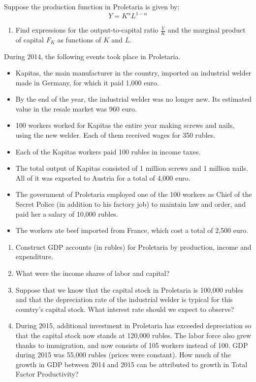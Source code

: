 Suppose the production function in Proletaria is given by:
\[
Y=K^\alpha L^{1-\alpha}
\]
\begin{enumerate}[label=(\alph*),leftmargin=2.2em,topsep=2pt,itemsep=1pt]
\item Find expressions for the output-to-capital ratio $\frac YK$ and the marginal product of capital $F_K$ as functions of $K$
and $L$.
\end{enumerate}
During 2014, the following events took place in Proletaria.
\begin{itemize}[leftmargin=2.2em,topsep=2pt,itemsep=1pt]
\item Kapitas, the main manufacturer in the country, imported an industrial welder made in Germany, for which it paid 1,000 euro.
\item By the end of the year, the industrial welder was no longer new. Its estimated value in the resale market was 960 euro.
\item 100 workers worked for Kapitas the entire year making screws and nails, using the new welder. Each of them received wages
for 350 rubles.
\item Each of the Kapitas workers paid 100 rubles in income taxes.
\item The total output of Kapitas consisted of 1 million screws and 1 million nails. All of it was exported to Austria for a total
of 4,000 euro.
\item The government of Proletaria employed one of the 100 workers as Chief of the Secret Police (in addition to his factory job)
to maintain law and order, and paid her a salary of 10,000 rubles.
\item The workers ate beef imported from France, which cost a total of 2,500 euro.
\end{itemize}
\begin{enumerate}[label=(\alph*),leftmargin=2.2em,topsep=2pt,itemsep=1pt,start=2]
\item Construct GDP accounts (in rubles) for Proletaria by production, income and expenditure.
\item What were the income shares of labor and capital?
\item Suppose that we know that the capital stock in Proletaria is 100,000 rubles and that the depreciation rate of the
industrial welder is typical for this country's capital stock. What interest rate should we expect to observe?
\item During 2015, additional investment in Proletaria has exceeded depreciation so that the capital stock now stands at
120,000 rubles. The labor force also grew thanks to immigration, and now consists of 105 workers instead of 100. GDP during 2015
was 55,000 rubles (prices were constant). How much of the growth in GDP between 2014 and 2015 can be attributed to growth in
Total Factor Productivity?
\end{enumerate}
